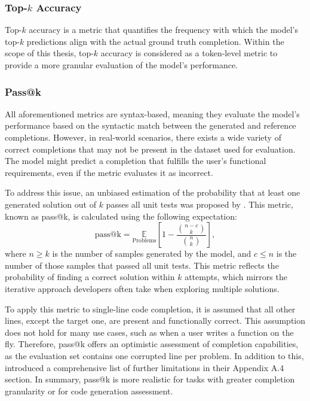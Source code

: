 \subsubsection*{Top-\(k\) Accuracy}

Top-\(k\) accuracy is a metric that quantifies the frequency with which the model's top-\(k\) predictions align with the actual ground truth completion. Within the scope of this thesis, top-\(k\) accuracy is considered as a token-level metric to provide a more granular evaluation of the model's performance.

\subsubsection*{Pass@k}

\begin{sloppypar}
All aforementioned metrics are syntax-based, meaning they evaluate the model's performance based on the syntactic match between the generated and reference completions. However, in real-world scenarios, there exists a wide variety of correct completions that may not be present in the dataset used for evaluation. The model might predict a completion that fulfills the user's functional requirements, even if the metric evaluates it as incorrect.
\end{sloppypar}

To address this issue, an unbiased estimation of the probability that at least one generated solution out of \(k\) passes all unit tests was proposed by \citet{chen2021}. This metric, known as pass@k, is calculated using the following expectation:
\begin{equation}
    \text{pass@k} = \underset{\mathrm{Problems}}{\mathbb{E}}\left[1 - \frac{\binom{n-c}{k}}{\binom{n}{k}}\right],
\end{equation}
where \(n \ge k\) is the number of samples generated by the model, and \(c \le n\) is the number of those samples that passed all unit tests. This metric reflects the probability of finding a correct solution within \(k\) attempts, which mirrors the iterative approach developers often take when exploring multiple solutions.

To apply this metric to single-line code completion, it is assumed that all other lines, except the target one, are present and functionally correct. This assumption does not hold for many use cases, such as when a user writes a function on the fly. Therefore, pass@k offers an optimistic assessment of completion capabilities, as the evaluation set contains one corrupted line per problem. In addition to this, \citet{liu2024} introduced a comprehensive list of further limitations in their Appendix A.4 section. In summary, pass@k is more realistic for tasks with greater completion granularity or for code generation assessment.


